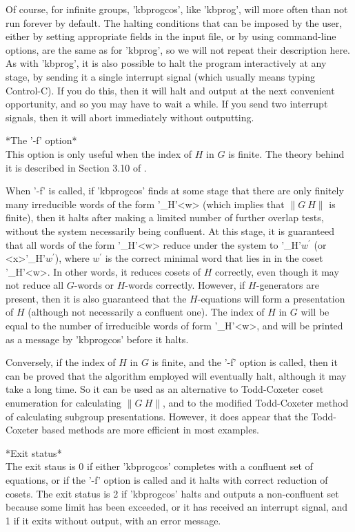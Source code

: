 Of course, for infinite groups, 'kbprogcos', like 'kbprog',
will more often than not run forever by default.
The halting conditions that can be imposed by the user, either by
setting appropriate fields in the input file, or by using
command-line options, are the same as for 'kbprog', so we will not
repeat their description here.  As with 'kbprog',
it is also possible to halt the program interactively at any stage, by
sending it a single interrupt signal (which usually means typing Control-C).
If you do this, then it will halt and output at the next convenient
opportunity, and so you may have to wait a while. If you send two interrupt
signals, then it will abort immediately without outputting.

*The '-f' option*\\
This option is only useful when the index of $H$ in $G$ is finite.
The theory behind it is described in Section 3.10 of \cite{Sims94}.

When '-f' is called, if 'kbprogcos' finds at some stage that there are only
finitely many irreducible words of the form '\_H'<w> (which implies
that $\|G\:H\|$ is finite), then it halts after making a limited number of
further overlap tests, without the system necessarily being confluent.
At this stage, it is guaranteed that all words of the form '\_H'<w>
reduce under the system to '\_H'$w^\prime$ (or <x>'\_H'$w^\prime$), where
$w^\prime$ is the correct minimal word that lies in in the coset '\_H'<w>.
In other words, it reduces cosets of $H$ correctly, even though it may not
reduce all $G$-words or $H$-words correctly. However, if $H$-generators are
present, then it is also guaranteed that the $H$-equations will form a
presentation of $H$ (although not necessarily a confluent one).
The index of $H$ in $G$ will be equal to the number of irreducible words of
form '\_H'<w>, and will be printed as a message by 'kbprogcos' before it
halts.

Conversely, if the index of $H$ in $G$ is finite, and the '-f' option is
called, then it can be proved that the algorithm employed will eventually
halt, although it may take a long time. So it can be used as an
alternative to Todd-Coxeter coset enumeration for calculating $\|G\:H\|$, and
to the modified Todd-Coxeter method of calculating subgroup presentations.
However, it does appear that the Todd-Coxeter based methods are more
efficient in most examples.

*Exit status*\\
The exit staus is 0 if either 'kbprogcos' completes with a confluent set of
equations, or if the '-f' option is called and it halts with correct
reduction of cosets. The exit status is
2 if 'kbprogcos' halts and outputs a non-confluent set because some limit has
been exceeded, or it has received an interrupt signal, and 1 if it exits
without output, with an error message.

